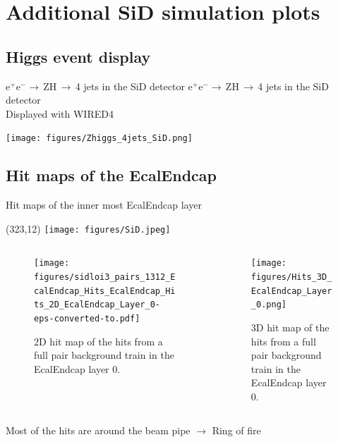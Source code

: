 \documentclass[xcolor={dvipsnames}]{beamer}
\newcommand{\sidlogo}{
  \setlength{\TPHorizModule}{1pt}
  \setlength{\TPVertModule}{1pt}
  \begin{textblock}{1}(323,12)
   \texttt{[image: figures/SiD.jpeg]}
  \end{textblock}
  }
\begin{document}
\section{Additional SiD simulation plots}

\subsection{Higgs event display}
\begin{frame}[label=ZH_event_display]{e$^+$e$^-\rightarrow$\,ZH\,$\rightarrow$\,4 jets in the SiD detector}
e$^+$e$^-\rightarrow$\,ZH\,$\rightarrow$\,4 jets in the SiD detector\\
Displayed with WIRED4
 \begin{center}
   \texttt{[image: figures/Zhiggs\_4jets\_SiD.png]}\\
 \hyperlink{HitsEcalEndcaps}{}
 \end{center}
\end{frame}

\subsection{Hit maps of the EcalEndcap}
\begin{frame}{Hit maps of the inner most EcalEndcap layer}
\sidlogo
\begin{columns}[T]
\begin{column}[b]{0.5\textwidth}
 \begin{figure}
\centering
\texttt{[image: figures/sidloi3\_pairs\_1312\_EcalEndcap\_Hits\_EcalEndcap\_Hits\_2D\_EcalEndcap\_Layer\_0-eps-converted-to.pdf]}
\caption{\small 2D hit map of the hits from a full pair background train in the EcalEndcap layer 0.}
\end{figure}
\end{column}
\begin{column}[b]{0.5\textwidth}
 \begin{figure}
\centering
\texttt{[image: figures/Hits\_3D\_EcalEndcap\_Layer\_0.png]}
\caption{\small 3D hit map of the hits from a full pair background train in the EcalEndcap layer 0.}
\end{figure}
\end{column}
\end{columns}
Most of the hits are around the beam pipe $\rightarrow$ Ring of fire
\end{frame}
\end{document}

